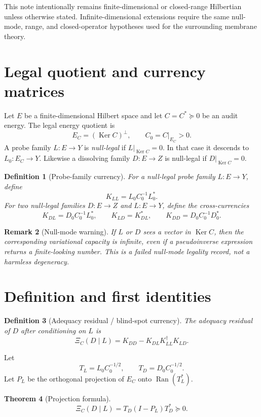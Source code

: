 \documentclass[11pt]{article}
\newtheorem{theorem}{Theorem}[section]
\newtheorem{definition}[theorem]{Definition}
\newtheorem{remark}[theorem]{Remark}
\newcommand{\Ran}{\operatorname{Ran}}
\newcommand{\Ker}{\operatorname{Ker}}
\begin{document}
This note intentionally remains finite-dimensional or closed-range Hilbertian unless otherwise stated.  Infinite-dimensional extensions require the same null-mode, range, and closed-operator hypotheses used for the surrounding membrane theory.

\section{Legal quotient and currency matrices}

Let \(E\) be a finite-dimensional Hilbert space and let \(C=C^*\succeq0\) be an audit energy.  The legal energy quotient is
\[
E_C=(\Ker C)^\perp,
\qquad C_0=C|_{E_C}>0.
\]
A probe family \(L:E\to Y\) is \emph{null-legal} if \(L|_{\Ker C}=0\).  In that case it descends to \(L_0:E_C\to Y\).  Likewise a dissolving family \(D:E\to Z\) is null-legal if \(D|_{\Ker C}=0\).

\begin{definition}[Probe-family currency]
For a null-legal probe family \(L:E\to Y\), define
\[
K_{LL}=L_0C_0^{-1}L_0^*.
\]
For two null-legal families \(D:E\to Z\) and \(L:E\to Y\), define the cross-currencies
\[
K_{DL}=D_0C_0^{-1}L_0^*,\qquad
K_{LD}=K_{DL}^*,\qquad
K_{DD}=D_0C_0^{-1}D_0^*.
\]
\end{definition}

\begin{remark}[Null-mode warning]
If \(L\) or \(D\) sees a vector in \(\Ker C\), then the corresponding variational capacity is infinite, even if a pseudoinverse expression returns a finite-looking number.  This is a failed null-mode legality record, not a harmless degeneracy.
\end{remark}

\section{Definition and first identities}

\begin{definition}[Adequacy residual / blind-spot currency]
The adequacy residual of \(D\) after conditioning on \(L\) is
\[
\boxed{
\Xi_C(D\mid L)=K_{DD}-K_{DL}K_{LL}^{\dagger}K_{LD}.
}
\]
\end{definition}

Let
\[
T_L=L_0C_0^{-1/2},\qquad T_D=D_0C_0^{-1/2}.
\]
Let \(P_L\) be the orthogonal projection of \(E_C\) onto \(\Ran(T_L^*)\).

\begin{theorem}[Projection formula]
\[
\boxed{
\Xi_C(D\mid L)=T_D(I-P_L)T_D^*\succeq0.
}
\]
\end{theorem}
\end{document}
